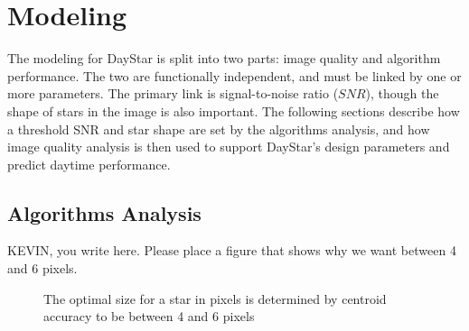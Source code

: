 \documentclass[twocolumn,letterpaper]{IEEEAerospace2012}
\newcommand{\SNR}{\mathit{SNR}}
\begin{document}
\section{Modeling}
The modeling for DayStar is split into two parts: image quality and algorithm performance. The two are functionally independent, and must be linked by one or more parameters. The primary link is signal-to-noise ratio ($\SNR$), though the shape of stars in the image is also important. The following sections describe how a threshold SNR and star shape are set by the algorithms analysis, and how image quality analysis is then used to support DayStar's design parameters and predict daytime performance.

\subsection{Algorithms Analysis}
KEVIN, you write here.
Please place a figure that shows why we want between 4 and 6 pixels.
\begin{figure}
    \label{fig:blur}
    \caption{The optimal size for a star in pixels is determined by centroid accuracy to be between 4 and 6 pixels}
\end{figure}
\end{document}
